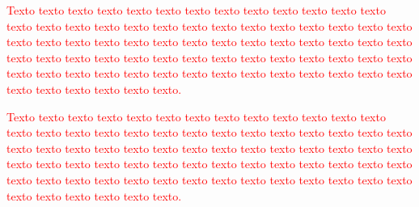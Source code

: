 \documentclass[normaltoc, espacoumemeio, pnumromarab,ruledheader]{abnt}
\begin{document}
\textcolor{red}{Texto texto texto texto texto texto texto texto texto texto texto texto texto texto texto texto texto texto texto texto texto texto texto texto texto texto texto texto texto texto texto texto texto texto texto texto texto texto texto texto texto texto texto texto texto texto texto texto texto texto texto texto texto texto texto texto texto texto texto texto texto texto texto texto texto texto texto texto texto texto texto texto texto texto texto.}

\textcolor{red}{Texto texto texto texto texto texto texto texto texto texto texto texto texto texto texto texto texto texto texto texto texto texto texto texto texto texto texto texto texto texto texto texto texto texto texto texto texto texto texto texto texto texto texto texto texto texto texto texto texto texto texto texto texto texto texto texto texto texto texto texto texto texto texto texto texto texto texto texto texto texto texto texto texto texto texto.}
    

%


\end{document}
